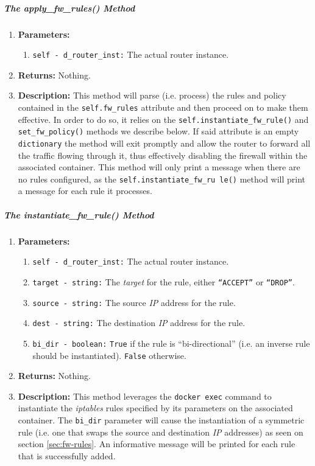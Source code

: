         \subparagraph{The apply\_fw\_rules() Method}
            \begin{enumerate}
                \item \textbf{Parameters:}
                \begin{enumerate}
                    \item \texttt{self - d\_router\_inst:} The actual router instance.
                \end{enumerate}
                \item \textbf{Returns:} Nothing.
                \item \textbf{Description:} This method will parse (i.e. process) the rules and policy contained in the \texttt{self.fw\_rules} attribute and then proceed on to make them effective. In order to do so, it relies on the \texttt{self.instantiate\_fw\_rule()} and \texttt{set\_fw\_policy()} methods we describe below. If said attribute is an empty \texttt{dictionary} the method will exit promptly and allow the router to forward all the traffic flowing through it, thus effectively disabling the firewall within the associated container. This method will only print a message when there are no rules configured, as the \texttt{self.instantiate\_fw\_ru le()} method will print a message for each rule it processes.
            \end{enumerate}

        \subparagraph{The instantiate\_fw\_rule() Method}
            \begin{enumerate}
                \item \textbf{Parameters:}
                \begin{enumerate}
                    \item \texttt{self - d\_router\_inst:} The actual router instance.
                    \item \texttt{target - string:} The \textit{target} for the rule, either \texttt{``ACCEPT''} or \texttt{``DROP''}.
                    \item \texttt{source - string:} The source \textit{IP} address for the rule.
                    \item \texttt{dest - string:} The destination \textit{IP} address for the rule.
                    \item \texttt{bi\_dir - boolean:} \texttt{True} if the rule is ``bi-directional'' (i.e. an inverse rule should be instantiated). \texttt{False} otherwise.
                \end{enumerate}
                \item \textbf{Returns:} Nothing.
                \item \textbf{Description:} This method leverages the \texttt{docker exec} command to instantiate the \textit{iptables} rules specified by its parameters on the associated container. The \texttt{bi\_dir} parameter will cause the instantiation of a symmetric rule (i.e. one that swaps the source and destination \textit{IP} addresses) as seen on section \ref{sec:fw-rules}. An informative message will be printed for each rule that is successfully added.
            \end{enumerate}

